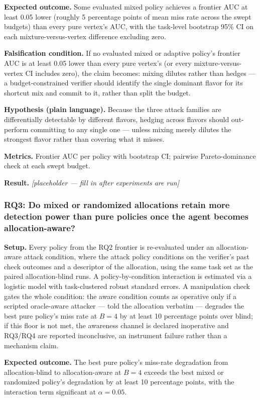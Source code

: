 \documentclass[11pt]{article}
\newcommand{\ph}{\textit{[placeholder --- fill in after experiments are run]}}
\begin{document}
\textbf{Expected outcome.} Some evaluated mixed policy achieves a frontier AUC at least 0.05 lower (roughly 5 percentage points of mean miss rate across the swept budgets) than every pure vertex's AUC, with the task-level bootstrap 95\% CI on each mixture-versus-vertex difference excluding zero.

\textbf{Falsification condition.} If no evaluated mixed or adaptive policy's frontier AUC is at least 0.05 lower than every pure vertex's (or every mixture-versus-vertex CI includes zero), the claim becomes: mixing dilutes rather than hedges --- a budget-constrained verifier should identify the single dominant flavor for its shortcut mix and commit to it, rather than split the budget.

\textbf{Hypothesis (plain language).} Because the three attack families are differentially detectable by different flavors, hedging across flavors should out-perform committing to any single one --- unless mixing merely dilutes the strongest flavor rather than covering what it misses.

\textbf{Metrics.} Frontier AUC per policy with bootstrap CI; pairwise Pareto-dominance check at each swept budget.

\textbf{Result.} \ph

\subsubsection{RQ3: Do mixed or randomized allocations retain more detection power than pure policies once the agent becomes allocation-aware?}
\textbf{Setup.} Every policy from the RQ2 frontier is re-evaluated under an allocation-aware attack condition, where the attack policy conditions on the verifier's past check outcomes and a descriptor of the allocation, using the same task set as the paired allocation-blind runs. A policy-by-condition interaction is estimated via a logistic model with task-clustered robust standard errors. A manipulation check gates the whole condition: the aware condition counts as operative only if a scripted oracle-aware attacker --- told the allocation verbatim --- degrades the best pure policy's miss rate at $B=4$ by at least 10 percentage points over blind; if this floor is not met, the awareness channel is declared inoperative and RQ3/RQ4 are reported inconclusive, an instrument failure rather than a mechanism claim.

\textbf{Expected outcome.} The best pure policy's miss-rate degradation from allocation-blind to allocation-aware at $B=4$ exceeds the best mixed or randomized policy's degradation by at least 10 percentage points, with the interaction term significant at $\alpha=0.05$.
\end{document}
